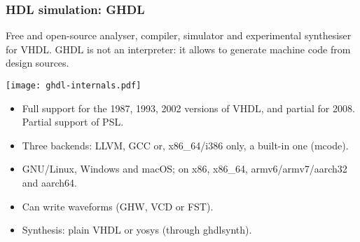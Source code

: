 \documentclass{beamer}
\begin{document}
\begin{frame}
\frametitle{HDL simulation: GHDL}
\small Free and open-source  analyser, compiler, simulator and experimental synthesiser for VHDL. GHDL is not an interpreter: it allows to generate machine code from design sources.

\vspace{1em}
\texttt{[image: ghdl-internals.pdf]}
\vspace{.5em}

\tiny
\begin{itemize}
  \item Full support for the 1987, 1993, 2002 versions of VHDL, and partial for 2008. Partial support of PSL.
  \item Three backends: LLVM, GCC or, x86\_64/i386 only, a built-in one (mcode).
  \item GNU/Linux, Windows and macOS; on x86, x86\_64, armv6/armv7/aarch32 and aarch64.
  \item Can write waveforms (GHW, VCD or FST).
  \item Synthesis: plain VHDL or yosys (through ghdlsynth).
\end{itemize}
\end{frame}

\end{document}
